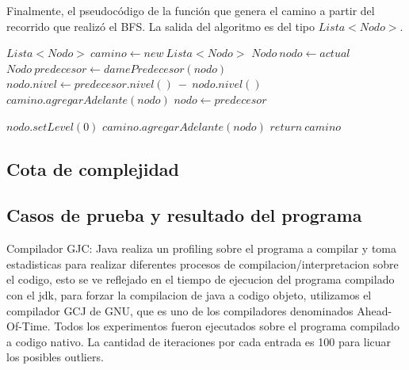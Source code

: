 \vspace{2mm}
Finalmente, el pseudoc\'odigo de la funci\'on que genera el camino a partir del recorrido que realiz\'o el BFS. La salida del algoritmo es del tipo $Lista<Nodo>$.
\vspace{2mm}
\begin{algorithmic}[1]


		\State $Lista<Nodo>\: camino \gets new\: Lista<Nodo>$
		\State $Nodo\: nodo \gets actual$
			\State $Nodo\: predecesor \gets damePredecesor(nodo)$
			\State $nodo.nivel \gets predecesor.nivel()\: -\: nodo.nivel()$
			\State $camino.agregarAdelante(nodo)$
			\State $nodo \gets predecesor$

		\EndWhile

		\State $nodo.setLevel(0)$
		\State $camino.agregarAdelante(nodo)$
		\State $return\: camino$
		
\EndProcedure
\end{algorithmic}


\subsection{Cota de complejidad} \label{ej_3:cota}



\subsection{Casos de prueba y resultado del programa} \label{ej_3:casos}

Compilador GJC: Java realiza un profiling sobre el programa a compilar y toma estadisticas para realizar diferentes procesos de compilacion/interpretacion sobre el codigo, esto se ve reflejado en el tiempo de ejecucion del programa compilado con el jdk, para forzar la compilacion de java a codigo objeto, utilizamos el compilador GCJ de GNU, que es uno de los compiladores denominados Ahead-Of-Time. Todos los experimentos fueron ejecutados sobre el programa compilado a codigo nativo. La cantidad de iteraciones por cada entrada es 100 para licuar los posibles outliers.

\vspace{2mm}

